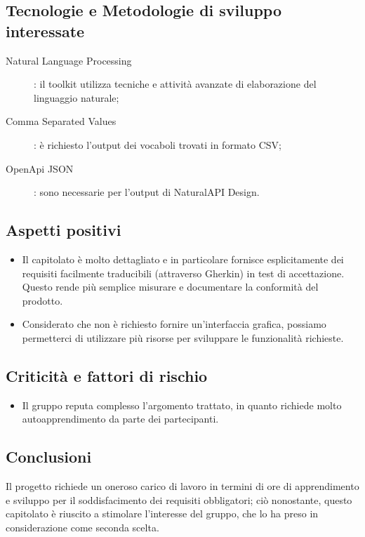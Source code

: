 \documentclass[../studio-di-fattibilita.tex]{subfiles}
\begin{document}
  \subsection{Tecnologie e Metodologie di sviluppo interessate}%
  \label{subsec:tecnologie_interessate}
  \begin{description}
    \item[Natural Language Processing]: il toolkit utilizza tecniche e attività avanzate di elaborazione del linguaggio naturale;
    \item[Comma Separated Values]: è richiesto l'output dei vocaboli trovati in formato CSV;
    \item[OpenApi JSON]: sono necessarie per l'output di NaturalAPI Design.
  \end{description}


  \subsection{Aspetti positivi}%
  \label{subsec:aspetti_positivi}
  \begin{itemize}
    \item Il capitolato è molto dettagliato e in particolare fornisce esplicitamente dei requisiti facilmente traducibili (attraverso Gherkin) in test di accettazione. Questo rende più semplice misurare e documentare la conformità del prodotto.
    \item Considerato che non è richiesto fornire un'interfaccia grafica, possiamo permetterci di utilizzare più risorse per sviluppare le funzionalità richieste.
  \end{itemize}


  \subsection{Criticità e fattori di rischio}%
  \label{subsec:criticita_e_fattori_di_rischio}
  \begin{itemize}
    \item Il gruppo reputa complesso l'argomento trattato, in quanto richiede molto autoapprendimento da parte dei partecipanti.
  \end{itemize}


  \subsection{Conclusioni}%
  \label{subsec:conclusioni}
  Il progetto richiede un oneroso carico di lavoro in termini di ore di apprendimento e sviluppo per il soddisfacimento dei requisiti obbligatori; ciò nonostante, questo capitolato è riuscito a stimolare l'interesse del gruppo, che lo ha preso in considerazione come seconda scelta.
\end{document}
